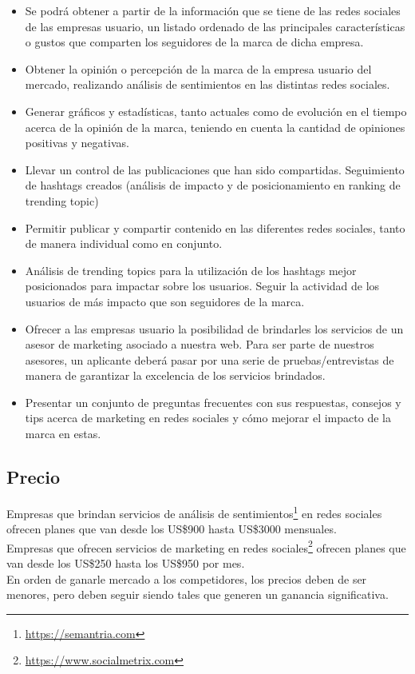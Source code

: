 \documentclass[oneside]{book}
\begin{document}
\begin{itemize}
\item Se podr\'{a} obtener a partir de la informaci\'{o}n que se tiene de las redes sociales de las empresas usuario, un listado ordenado de las principales caracter\'{i}sticas o gustos que comparten los seguidores de la marca de dicha empresa.

\item Obtener la opinión o percepción de la marca de la empresa usuario del mercado, realizando an\'{a}lisis de sentimientos en las distintas redes sociales.

\item Generar gráficos y estad\'{i}sticas, tanto actuales como de evoluci\'{o}n en el tiempo acerca de la opini\'{o}n de la marca, teniendo en cuenta la cantidad de opiniones positivas y negativas.

\item Llevar un control de las publicaciones que han sido compartidas.
Seguimiento de hashtags creados (an\'{a}lisis de impacto y de posicionamiento en ranking de trending topic)

\item Permitir publicar y compartir contenido en las diferentes redes sociales, tanto de manera individual como en conjunto. 

\item Análisis de trending topics para la utilización de los hashtags mejor posicionados para impactar sobre los usuarios.
Seguir la actividad de los usuarios de más impacto que son seguidores de la marca. 

\item Ofrecer a las empresas usuario la posibilidad de brindarles los servicios de un asesor de marketing asociado a nuestra web. Para ser parte de nuestros asesores, un aplicante deber\'{a} pasar por una serie de pruebas/entrevistas de manera de garantizar la excelencia de los servicios brindados. 

\item Presentar un conjunto de preguntas frecuentes con sus respuestas, consejos y tips acerca de marketing en redes sociales y cómo mejorar el impacto de la marca en estas.


\end{itemize}


	
\subsection{Precio}
Empresas que brindan servicios de análisis de sentimientos\footnote{\url{https://semantria.com}} en redes sociales ofrecen planes que van desde los US\$900 hasta US\$3000 mensuales. \\
Empresas que ofrecen servicios de marketing en redes sociales\footnote{\url{https://www.socialmetrix.com}} ofrecen planes que van desde los US\$250 hasta los US\$950 por mes.\\
En orden de ganarle mercado a los competidores, los precios deben de ser menores, pero deben seguir siendo tales que generen un ganancia significativa. 
\end{document}
